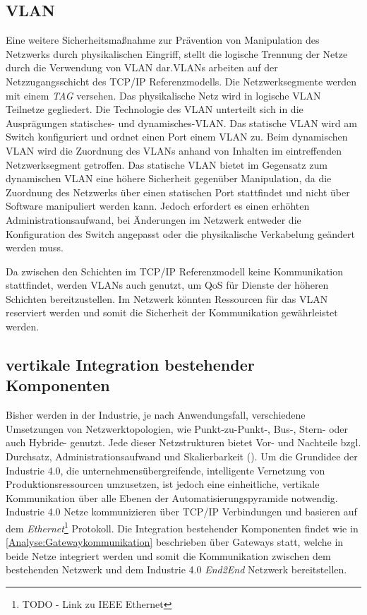 \subsection{\ac{VLAN}}
\label{Analyse:VLAN}
Eine weitere Sicherheitsmaßnahme zur Prävention von Manipulation des Netzwerks durch physikalischen Eingriff, stellt die logische Trennung der Netze durch die Verwendung von \ac{VLAN} dar.\ac{VLAN}s arbeiten auf der Netzzugangsschicht des \ac{TCP}/\ac{IP} Referenzmodells. Die Netzwerksegmente werden mit einem \textit{TAG} versehen. Das physikalische Netz wird in logische \ac{VLAN} Teilnetze gegliedert. Die Technologie des \ac{VLAN} unterteilt sich in die Ausprägungen statisches- und dynamisches-\ac{VLAN}. Das statische \ac{VLAN} wird am Switch konfiguriert und ordnet einen Port einem \ac{VLAN} zu. Beim dynamischen \ac{VLAN} wird die Zuordnung des \ac{VLAN}s anhand von Inhalten im eintreffenden Netzwerksegment getroffen. Das statische \ac{VLAN} bietet im Gegensatz zum dynamischen \ac{VLAN} eine höhere Sicherheit gegenüber Manipulation, da die Zuordnung des Netzwerks über einen statischen Port stattfindet und nicht über Software manipuliert werden kann. Jedoch erfordert es einen erhöhten Administrationsaufwand, bei Änderungen im Netzwerk entweder die Konfiguration des Switch angepasst oder die physikalische Verkabelung geändert werden muss.

Da zwischen den Schichten im \ac{TCP}/\ac{IP} Referenzmodell keine Kommunikation stattfindet, werden \ac{VLAN}s auch genutzt, um \ac{QoS} für Dienste der höheren Schichten bereitzustellen. Im Netzwerk könnten Ressourcen für das \ac{VLAN} reserviert werden und somit die Sicherheit der Kommunikation gewährleistet werden. 

\subsection{vertikale Integration bestehender Komponenten}
Bisher werden in der Industrie, je nach Anwendungsfall, verschiedene Umsetzungen von Netzwerktopologien, wie Punkt-zu-Punkt-, Bus-, Stern- oder auch Hybride- genutzt. Jede dieser Netzstrukturen bietet Vor- und Nachteile bzgl. Durchsatz, Administrationsaufwand und Skalierbarkeit (\cite{burke2013}). Um die Grundidee der Industrie 4.0, die unternehmensübergreifende, intelligente Vernetzung von Produktionsressourcen umzusetzen, ist jedoch eine einheitliche, vertikale Kommunikation über alle Ebenen der Automatisierungspyramide notwendig. Industrie 4.0 Netze kommunizieren über \ac{TCP}/\ac{IP} Verbindungen und basieren auf dem \textit{Ethernet}\footnote{TODO - Link zu IEEE Ethernet} Protokoll. Die Integration bestehender Komponenten findet wie in \autoref{Analyse:Gatewaykommunikation} beschrieben über Gateways statt, welche in beide Netze integriert werden und somit die Kommunikation zwischen dem bestehenden Netzwerk und dem Industrie 4.0 \textit{End2End} Netzwerk bereitstellen.

